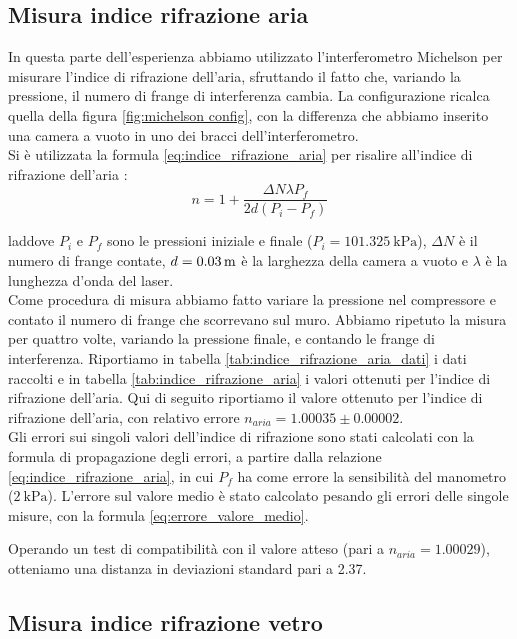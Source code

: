 \documentclass[letterpaper,12pt]{article}
\begin{document}
\subsection{Misura indice rifrazione aria}
In questa parte dell'esperienza abbiamo utilizzato l'interferometro Michelson per misurare l'indice di rifrazione 
dell'aria, sfruttando il fatto che, variando la pressione, il numero di frange di interferenza cambia. La configurazione
ricalca quella della figura \ref{fig:michelson config}, con la differenza che abbiamo inserito una camera a vuoto in uno 
dei bracci dell'interferometro.\\
Si è utilizzata la formula \ref{eq:indice_rifrazione_aria} per risalire all'indice di rifrazione dell'aria :
\begin{equation}
    n = 1 + \frac{\Delta N \lambda P_f}{2 d (P_i - P_f)}
    \label{eq:indice_rifrazione_aria}
\end{equation}

laddove $P_i$ e $P_f$ sono le pressioni iniziale e finale ($P_i = \SI{101.325}{\kilo\pascal}$), $\Delta N$ 
è il numero di frange contate, $d = \SI{0.03 \pm 0}{m}$ è la larghezza della camera a vuoto e $\lambda$ è la 
lunghezza d'onda del laser.\\
Come procedura di misura abbiamo fatto variare la pressione nel compressore e contato il numero di frange che scorrevano
sul muro. Abbiamo ripetuto la misura per quattro volte, variando la pressione finale, e contando le 
frange di interferenza. Riportiamo in tabella \ref{tab:indice_rifrazione_aria_dati} i dati raccolti e in tabella 
\ref{tab:indice_rifrazione_aria} i valori ottenuti per l'indice di rifrazione dell'aria. Qui di seguito riportiamo
il valore ottenuto per l'indice di rifrazione dell'aria, con relativo errore $n_{aria} = 1.00035 \pm 0.00002$.\\
Gli errori sui singoli valori dell'indice di rifrazione sono stati calcolati con la formula di propagazione degli errori,
a partire dalla relazione \ref{eq:indice_rifrazione_aria}, in cui $P_f$ ha come errore la sensibilità del manometro 
($\SI{2}{\kilo\pascal}$). L'errore sul valore medio è stato calcolato pesando gli errori delle singole misure, con la 
formula \ref{eq:errore_valore_medio}.

Operando un test di compatibilità con il valore atteso (pari a $n_{aria} = 1.00029$), otteniamo una distanza in 
deviazioni standard pari a 2.37.\\

\subsection{Misura indice rifrazione vetro}
\end{document}
